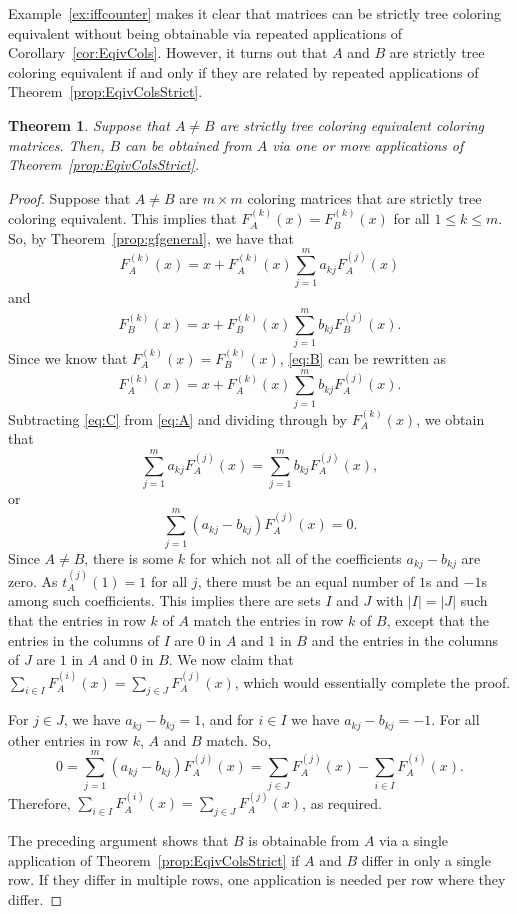 \documentclass[12pt]{amsart}
\newtheorem{theorem}{Theorem}
\newcommand{\gff}[2]{F_{#2}^{(#1)}(x)}
\newcommand{\gfa}[1]{\gff{#1}{A}}
\begin{document}
Example~\ref{ex:iffcounter} makes it clear that matrices can be strictly tree coloring equivalent without being obtainable via
repeated applications of Corollary~\ref{cor:EqivCols}. 
However, it turns out that $A$ and $B$ are strictly tree coloring equivalent if and only if they are related by repeated applications of Theorem~\ref{prop:EqivColsStrict}.
\begin{theorem}\label{thm:EqivColsStrictIff}
    Suppose that $A\neq B$ are strictly tree coloring equivalent coloring matrices. Then, $B$ can be obtained from $A$ via one or more applications of Theorem~\ref{prop:EqivColsStrict}.
\end{theorem}
\begin{proof}
    Suppose that $A\neq B$ are $m\times m$ coloring matrices that are strictly tree coloring equivalent. This implies that $\gfa{k}=\gff{k}{B}$ for all $1\leq k\leq m$. So, by Theorem~\ref{prop:gfgeneral}, we have that
    \begin{equation}\label{eq:A}
    \gfa{k}=x+\gfa{k}\sum_{j=1}^ma_{kj}\gfa{j}
    \end{equation}
    and
    \begin{equation}\label{eq:B}
    \gff{k}{B}=x+\gff{k}{B}\sum_{j=1}^mb_{kj}\gff{j}{B}.
    \end{equation}
    Since we know that $\gfa{k}=\gff{k}{B}$, \eqref{eq:B} can be rewritten as
    \begin{equation}\label{eq:C}
    \gfa{k}=x+\gfa{k}\sum_{j=1}^mb_{kj}\gfa{j}.
    \end{equation}
    Subtracting \eqref{eq:C} from \eqref{eq:A} and dividing through by $\gfa{k}$, we obtain that
    \[
    \sum_{j=1}^ma_{kj}\gfa{j}=\sum_{j=1}^mb_{kj}\gfa{j},
    \]
    or
    \[
    \sum_{j=1}^m(a_{kj}-b_{kj})\gfa{j}=0.
    \]
    Since $A\neq B$, there is some $k$ for which not all of the coefficients $a_{kj}-b_{kj}$ are zero. As $t^{(j)}_A(1)=1$ for all $j$, there must be an equal number of $1$s and $-1$s among such coefficients. This implies there are sets $I$ and $J$ with $|I|=|J|$ 
    such that the entries in row $k$ of $A$ match the entries in row $k$ of $B$, except that the entries in the columns of $I$ are $0$ in $A$ and $1$ in $B$ and the entries in the columns of $J$ are $1$ in $A$ and $0$ in $B$. We now claim that $\sum_{i\in I}\gfa{i}=\sum_{j\in J}\gfa{j}$, which would essentially complete the proof.
    
    For $j\in J$, we have $a_{kj}-b_{kj}=1$, and for $i\in I$ we have $a_{kj}-b_{kj}=-1$. For all other entries in row $k$, $A$ and $B$ match. So, 
    \[
    0=\sum_{j=1}^m(a_{kj}-b_{kj})\gfa{j}=\sum_{j\in J}\gfa{j}-\sum_{i\in I}\gfa{i}.
    \]
    Therefore, $\sum_{i\in I}\gfa{i}=\sum_{j\in J}\gfa{j}$, as required.

    The preceding argument shows that $B$ is obtainable from $A$ via a single application of Theorem~\ref{prop:EqivColsStrict} if $A$ and $B$ differ in only a single row. If they differ in multiple rows, one application is needed per row where they differ.
\end{proof}
\end{document}
